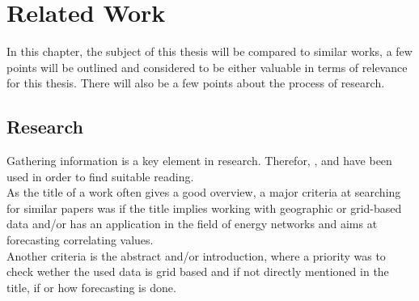 \chapter{Related Work}
\label{ch:RW}

In this chapter, the subject of this thesis will be compared to similar works, a few points will be outlined and considered to be either valuable in terms of relevance for this thesis. There will also be a few points about the process of research.\\

\section{Research}
\label{sec:res}

Gathering information is a key element in research. Therefor, , and  have been used in order to find suitable reading.\\
As the title of a work often gives a good overview, a major criteria at searching for similar papers was if the title implies working with geographic or grid-based data and/or has an application in the field of energy networks and aims at forecasting correlating values.\\
Another criteria is the abstract and/or introduction, where a priority was to check wether the used data is grid based and if not directly mentioned in the title, if or how forecasting is done.\\


